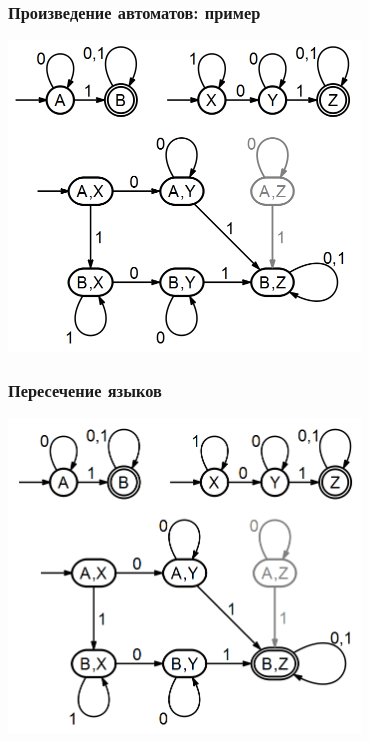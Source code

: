 \documentclass{beamer}
\begin{document}
\begin{frame}[fragile]
  \transwipe[direction=90]
  \frametitle{Произведение автоматов: пример}
  \begin{center}
  \includegraphics[width=0.7\textwidth]{pics/prod.png}  
  \end{center}
\end{frame}

\begin{frame}[fragile]
  \transwipe[direction=90]
  \frametitle{Пересечение языков}
  \begin{center}
  \includegraphics[width=0.7\textwidth]{pics/cap.png}  
  \end{center}
\end{frame}
\end{document}

